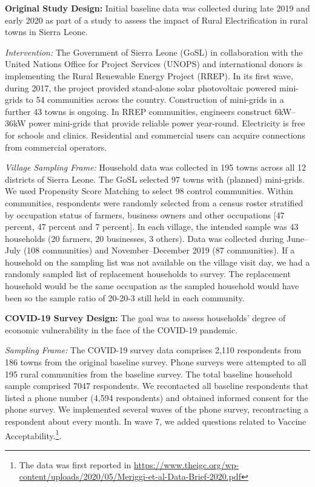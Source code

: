 \documentclass[
  12pt,
]{article}
\begin{document}
\textbf{Original Study Design:} Initial baseline data was collected during late 2019 and early 2020 as part of a study to assess the impact of Rural Electrification in rural towns in Sierra Leone.

\emph{Intervention:} The Government of Sierra Leone (GoSL) in collaboration with the United Nations Office for Project Services (UNOPS) and international donors is implementing the Rural Renewable Energy Project (RREP). In its first wave, during 2017, the project provided stand-alone solar photovoltaic powered mini-grids to 54 communities across the country. Construction of mini-grids in a further 43 towns is ongoing. In RREP communities, engineers construct 6kW--36kW power mini-grids that provide reliable power year-round. Electricity is free for schools and clinics. Residential and commercial users can acquire connections from commercial operators.

\emph{Village Sampling Frame:} Household data was collected in 195 towns across all 12 districts of Sierra Leone. The GoSL selected 97 towns with (planned) mini-grids. We used Propensity Score Matching to select 98 control communities. Within communities, respondents were randomly selected from a census roster stratified by occupation status of farmers, business owners and other occupations {[}47 percent, 47 percent and 7 percent{]}. In each village, the intended sample was 43 households (20 farmers, 20 businesses, 3 others). Data was collected during June--July (108 communities) and November--December 2019 (87 communities). If a household on the sampling list was not available on the village visit day, we had a randomly sampled list of replacement households to survey. The replacement household would be the same occupation as the sampled household would have been so the sample ratio of 20-20-3 still held in each community.

\textbf{COVID-19 Survey Design:} The goal was to assess households' degree of economic vulnerability in the face of the COVID-19 pandemic.

\emph{Sampling Frame:} The COVID-19 survey data comprises 2,110 respondents from 186 towns from the original baseline survey. Phone surveys were attempted to all 195 rural communities from the baseline survey. The total baseline household sample comprised 7047 respondents. We recontacted all baseline respondents that listed a phone number (4,594 respondents) and obtained informed consent for the phone survey. We implemented several waves of the phone survey, recontracting a respondent about every month. In wave 7, we added questions related to Vaccine Acceptability.\footnote{The data was first reported in \url{https://www.theigc.org/wp-content/uploads/2020/05/Meriggi-et-al-Data-Brief-2020.pdf}}.
\end{document}

